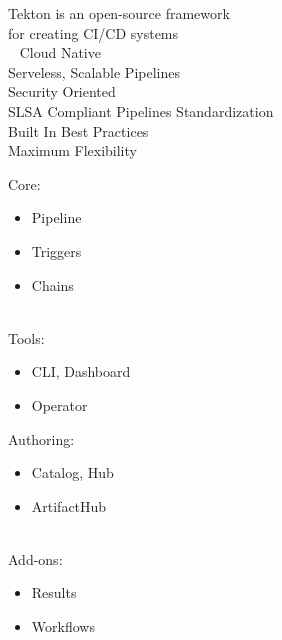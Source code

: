 \documentclass[aspectratio=169,11pt,hyperref={colorlinks=true}]{beamer}
\begin{document}
\begin{stripedframe}%
  {%
  Tekton is an open-source framework \\ for creating CI/CD systems \\ ~
  }%
  {%
  Cloud Native \\
  \vspace{0.03\textheight}
  Serveless, Scalable Pipelines \\
  \vspace{0.03\textheight}
  Security Oriented \\
  \vspace{0.03\textheight}
  SLSA Compliant Pipelines
  }%
  {%
  Standardization \\
  \vspace{0.03\textheight}
  Built In Best Practices \\
  \vspace{0.03\textheight}
  Maximum Flexibility \\
  }%
  {%
  \vspace{0.01\textheight}
  Core:
  \begin{itemize}
    \item Pipeline
    \item Triggers
    \item Chains
  \end{itemize}
  ~ \\
  Tools:
  \begin{itemize}
    \item CLI, Dashboard
    \item Operator
  \end{itemize}
  }%
  {%
  Authoring:
  \begin{itemize}
    \item Catalog, Hub
    \item ArtifactHub
  \end{itemize}
  ~ \\
  Add-ons:
  \begin{itemize}
    \item Results
    \item Workflows
  \end{itemize}
  }%
\end{stripedframe}
\end{document}
